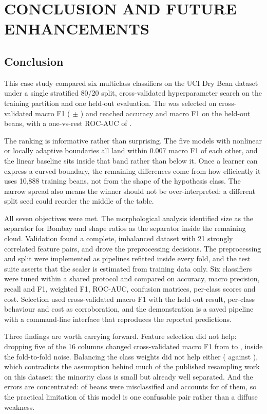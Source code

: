 \chapter{CONCLUSION AND FUTURE ENHANCEMENTS}

\section{Conclusion}

This case study compared six multiclass classifiers on the UCI Dry Bean dataset
under a single stratified 80/20 split, cross-validated hyperparameter search on
the training partition and one held-out evaluation. The \BestModel{} was selected
on cross-validated macro F1 (\BestCV{} $\pm$ \BestCVStd{}) and reached \BestAcc{}
accuracy and \BestFOne{} macro F1 on the \TestRows{} held-out beans, with a
one-vs-rest ROC-AUC of \BestAUC.

The ranking is informative rather than surprising. The five models with nonlinear
or locally adaptive boundaries all land within 0.007 macro F1 of each other, and
the linear baseline sits inside that band rather than below it. Once a learner can
express a curved boundary, the remaining differences come from how efficiently it
uses 10,888 training beans, not from the shape of the hypothesis class. The narrow
spread also means the winner should not be over-interpreted: a different split
seed could reorder the middle of the table.

All seven objectives were met. The morphological analysis identified size as the
separator for Bombay and shape ratios as the separator inside the remaining cloud.
Validation found a complete, imbalanced dataset with 21 strongly correlated
feature pairs, and drove the preprocessing decisions. The preprocessing and split
were implemented as pipelines refitted inside every fold, and the test suite
asserts that the scaler is estimated from training data only. Six classifiers were
tuned within a shared protocol and compared on accuracy, macro precision, recall
and F1, weighted F1, ROC-AUC, confusion matrices, per-class scores and cost.
Selection used cross-validated macro F1 with the held-out result, per-class
behaviour and cost as corroboration, and the demonstration is a saved pipeline
with a command-line interface that reproduces the reported predictions.

Three findings are worth carrying forward. Feature selection did not help:
dropping five of the 16 columns changed cross-validated macro F1 from
\AblationFull{} to \AblationReduced{}, inside the fold-to-fold noise. Balancing the
class weights did not help either (\CWNone{} against \CWBalanced{}), which
contradicts the assumption behind much of the published resampling work on this
dataset: the minority class is small but already well separated. And the errors
are concentrated: \TestErrors{} of \TestRows{} beans were misclassified and
\TopConfusion{} accounts for \TopConfusionN{} of them, so the practical limitation
of this model is one confusable pair rather than a diffuse weakness.

